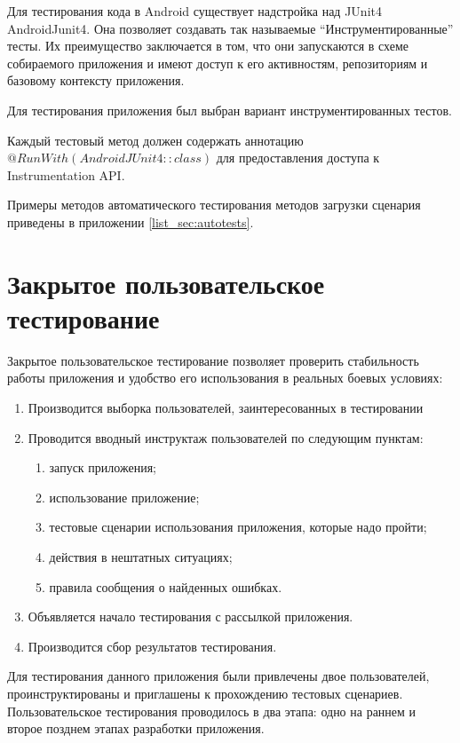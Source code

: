 Для тестирования кода в Android существует надстройка над JUnit4 \textemdash\space AndroidJunit4. Она позволяет создавать так называемые ``Инструментированные'' тесты. Их преимущество заключается в том, что они запускаются в схеме собираемого приложения и имеют доступ к его активностям, репозиториям и базовому контексту приложения.

Для тестирования приложения был выбран вариант инструментированных тестов.

Каждый тестовый метод должен содержать аннотацию $@RunWith(AndroidJUnit4::class)$ для предоставления доступа к Instrumentation API.

Примеры методов автоматического тестирования методов загрузки сценария приведены в приложении \ref{list_sec:autotests}.

\section{Закрытое пользовательское тестирование}
\label{sec:usertesting}
Закрытое пользовательское тестирование позволяет проверить стабильность работы приложения и удобство его использования в реальных боевых условиях:
\begin{enumerate}
	\item Производится выборка пользователей, заинтересованных в тестировании
	\item Проводится вводный инструктаж пользователей по следующим пунктам:
	\begin{enumerate}
		\item запуск приложения;
		\item использование приложение;
		\item тестовые сценарии использования приложения, которые надо пройти;
		\item действия в нештатных ситуациях;
		\item правила сообщения о найденных ошибках.
	\end{enumerate}
	\item Объявляется начало тестирования с рассылкой приложения.
	\item Производится сбор результатов тестирования.
\end{enumerate}

Для тестирования данного приложения были привлечены двое пользователей, проинструктированы и приглашены к прохождению тестовых сценариев.
Пользовательское тестирования проводилось в два этапа: одно на раннем и второе позднем этапах разработки приложения.

